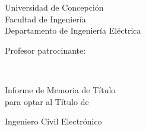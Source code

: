 \thispagestyle{empty}
\begin{minipage}{8cm}
\begin{flushleft}
\begin{large}
\noindent\textsf{Universidad de Concepción}\\
\textsf{Facultad de Ingeniería}\\
\textsf{Departamento de Ingeniería Eléctrica}\\[2cm]
\end{large}
\end{flushleft}
\end{minipage}
\hfill
\begin{minipage}{8cm}
\begin{flushright}
\begin{large}
\noindent\textsf{Profesor patrocinante:}\\
\makeatletter
\textsf{\@ProfGuia}
\makeatother
\end{large}
\end{flushright}
\end{minipage}

\vspace*{6cm}

\begin{center}

\makeatletter
{\Huge\@title \par}%
\makeatother
\vspace*{\fill}
{\Large{\textbf{\textsf{\Author}}}}\\[1.6cm]
{\Large{\textsf{Informe de Memoria de Título\\ para optar al Título de}}\par}
\vspace{1cm}
{\Large \textsf{Ingeniero Civil Electrónico}}
\vfill
{\Large \textsf{\monthname\ \the\year}}
\end{center}
\ifdefined\NoBgThispage
\NoBgThispage
\fi
\newpage